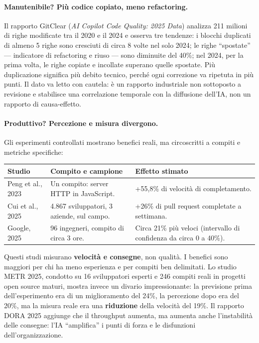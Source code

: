 \documentclass[12pt]{extarticle}
\begin{document}
\paragraph{Manutenibile? Più codice copiato, meno refactoring.}
Il rapporto GitClear (\textit{AI Copilot Code Quality: 2025 Data}) analizza 211 milioni di righe modificate tra il 2020 e il 2024 e osserva tre tendenze: i blocchi duplicati di almeno 5 righe sono cresciuti di circa 8 volte nel solo 2024; le righe ``spostate'' — indicatore di refactoring e riuso — sono diminuite del 40\%; nel 2024, per la prima volta, le righe copiate e incollate superano quelle spostate. Più duplicazione significa più debito tecnico, perché ogni correzione va ripetuta in più punti. Il dato va letto con cautela: è un rapporto industriale non sottoposto a revisione e stabilisce una correlazione temporale con la diffusione dell'IA, non un rapporto di causa-effetto.

\paragraph{Produttivo? Percezione e misura divergono.}
Gli esperimenti controllati mostrano benefici reali, ma circoscritti a compiti e metriche specifiche:

\begin{center}
\small
\begin{tabular}{p{4.0cm}p{6.4cm}p{5.6cm}}
    \toprule
    \textbf{Studio} & \textbf{Compito e campione} & \textbf{Effetto stimato} \\
    \midrule
    Peng et al., 2023 & Un compito: server HTTP in JavaScript. & +55,8\% di velocità di completamento. \\
    \addlinespace
    Cui et al., 2025 & 4.867 sviluppatori, 3 aziende, sul campo. & +26\% di pull request completate a settimana. \\
    \addlinespace
    Google, 2025 & 96 ingegneri, compito di circa 3 ore. & Circa 21\% più veloci (intervallo di confidenza da circa 0 a 40\%). \\
    \bottomrule
\end{tabular}
\end{center}

\noindent Questi studi misurano \textbf{velocità e consegne}, non qualità. I benefici sono maggiori per chi ha meno esperienza e per compiti ben delimitati. Lo studio METR 2025, condotto su 16 sviluppatori esperti e 246 compiti reali in progetti open source maturi, mostra invece un divario impressionante: la previsione prima dell'esperimento era di un miglioramento del 24\%, la percezione dopo era del 20\%, ma la misura reale era una \textbf{riduzione} della velocità del 19\%. Il rapporto DORA 2025 aggiunge che il throughput aumenta, ma aumenta anche l'instabilità delle consegne: l'IA ``amplifica'' i punti di forza e le disfunzioni dell'organizzazione.
\end{document}
